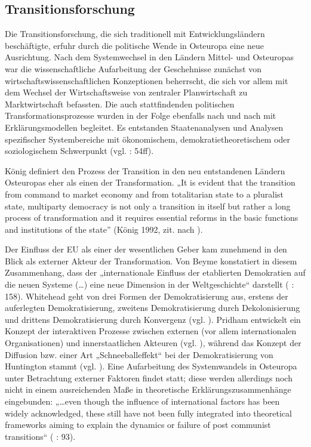 \subsection{Transitionsforschung}
Die Transitionsforschung, die sich traditionell mit Entwicklungsländern beschäftigte, erfuhr durch die politische Wende in Osteuropa eine neue Ausrichtung. Nach dem Systemwechsel in den Ländern Mittel- und Osteuropas war die wissenschaftliche Aufarbeitung der Geschehnisse zunächst von wirtschaftswissenschaftlichen Konzeptionen beherrscht, die sich vor allem mit dem Wechsel der Wirtschaftsweise von zentraler Planwirtschaft zu Marktwirtschaft befassten. Die auch stattfindenden politischen Transformationsprozesse wurden in der Folge ebenfalls nach und nach mit Erklärungsmodellen begleitet. Es entstanden Staatenanalysen und Analysen spezifischer Systembereiche mit ökonomischem, demokratietheoretischem oder soziologischem Schwerpunkt (vgl. \cite{huszak} : 54ff).\par
König definiert den Prozess der Transition in den neu entstandenen Ländern Osteuropas eher als einen der Transformation. „It is evident that the transition from command to market economy and from totalitarian state to a pluralist state, multiparty democracy is not only a transition in itself but rather a long process of transformation and it requires essential reforms in the basic functions and institutions of the state” (König 1992, zit. nach \cite{jenei}). \par
Der Einfluss der EU als einer der wesentlichen Geber kam zunehmend in den Blick als externer Akteur der Transformation. Von Beyme konstatiert in diesem Zusammenhang, dass der „internationale Einfluss der etablierten Demokratien auf die neuen Systeme (…) eine neue Dimension in der Weltgeschichte“ darstellt (\cite{beyme} : 158). Whitehead geht von drei Formen der Demokratisierung aus, erstens der auferlegten Demokratisierung, zweitens Demokratisierung durch Dekolonisierung und drittens Demokratisierung durch Konvergenz (vgl. \cite{whitehead}). Pridham entwickelt ein Konzept der interaktiven Prozesse zwischen externen (vor allem internationalen Organisationen) und innerstaatlichen Akteuren (vgl. \cite{pridham91,pridham95,pridham08}), während das Konzept der Diffusion bzw. einer Art „Schneeballeffekt“ bei der Demokratisierung von Huntington stammt (vgl. \cite{hunting}). Eine Aufarbeitung des Systemwandels in Osteuropa unter Betrachtung externer Faktoren findet statt; diese werden allerdings noch nicht in einem ausreichenden Maße in theoretische Erklärungszusammenhänge eingebunden: „…even though the influence of international factors has been widely acknowledged, these still have not been fully integrated into theoretical frameworks aiming to explain the dynamics or failure of post communist transitions“ (\cite{dimpri} : 93).\par
